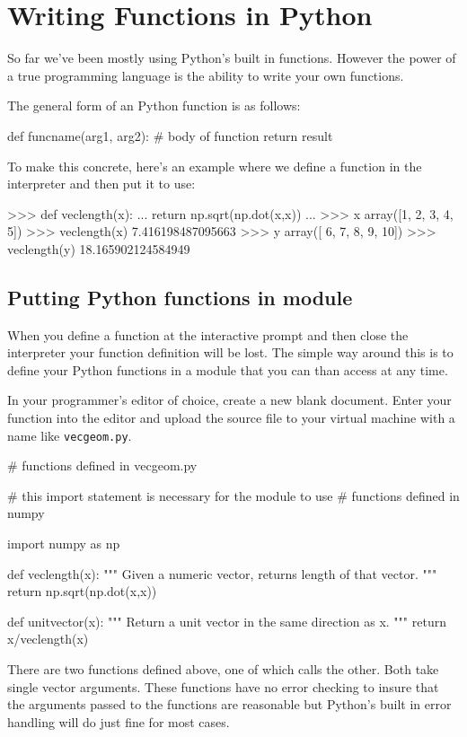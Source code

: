 
\section{Writing Functions in Python}

So far we've been mostly using Python's built in functions. However the power of a
true programming language is the ability to write your own functions.

The general form of an Python function is as follows:

\begin{python}
def funcname(arg1, arg2):
    # body of function
    return result

\end{python}
%
To make this concrete, here's an example where we define a function in
the interpreter and then put it to use:
%
\begin{python}
>>> def veclength(x):
...     return np.sqrt(np.dot(x,x))
...
>>> x
array([1, 2, 3, 4, 5])
>>> veclength(x)
7.416198487095663
>>> y
array([ 6,  7,  8,  9, 10])
>>> veclength(y)
18.165902124584949
\end{python}

\subsection{Putting Python functions in module}

When you define a function at the interactive prompt and then close the
interpreter your function definition will be lost. The simple way around
this is to define your Python functions in a module that you can than access
at any time.

In your programmer's editor of choice, create a new blank document. Enter your function into the editor
and upload the source file to your virtual machine with a name like
\lstinline!vecgeom.py!.

\begin{python}
# functions defined in vecgeom.py

# this import statement is necessary for the module to use
# functions defined in numpy

import numpy as np

def veclength(x):
    """ Given a numeric vector, returns length of that vector. """
    return np.sqrt(np.dot(x,x))


def unitvector(x):
    """ Return a unit vector in the same direction as x. """
    return x/veclength(x)


\end{python}
There are two functions defined above, one of which calls the other. Both take single vector arguments. These functions have no error checking to insure that the arguments passed to the functions are reasonable but Python's built in error handling will do just fine for most cases.

